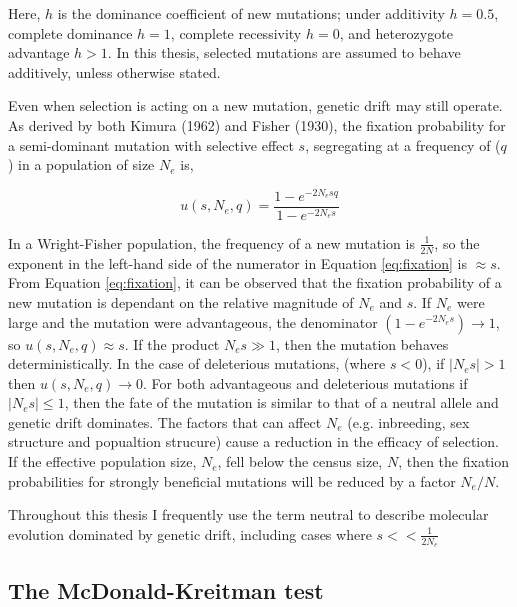\noindent

Here, $h$ is the dominance coefficient of new mutations; under additivity $h = 0.5$,  complete dominance $h = 1$, complete recessivity $h = 0$, and heterozygote advantage $h > 1$. In this thesis, selected mutations are assumed to behave additively, unless otherwise stated. 

	Even when selection is acting on a new mutation, genetic drift may still operate. As derived by both Kimura (1962) and Fisher (1930), the fixation probability for a semi-dominant mutation with selective effect $s$, segregating at a frequency of ($q$) in a population of size $N_e$ is,

\begin{equation}
	u(s, N_e, q) = \frac{1 - e^{-2N_esq}}{1 - e^{-2N_es}}
	\label{eq:fixation}
\end{equation}

\noindent
In a Wright-Fisher population, the frequency of a new mutation is $\frac{1}{2N}$, so the exponent in the left-hand side of the numerator in Equation \ref{eq:fixation} is $\approx s$. From Equation \ref{eq:fixation}, it can be observed that the fixation probability of a new mutation is dependant on the relative magnitude of $N_e$ and $s$. If $N_e$ were large and the mutation were advantageous, the denominator $(1 - e^{-2N_es}) \to 1$, so $u(s, N_e, q) \approx s$. If the product $N_es \gg 1$, then the mutation behaves deterministically. In the case of deleterious mutations, (where $s < 0$), if $|N_es| > 1$ then $u(s, N_e, q) \to 0$.  For both advantageous and deleterious mutations if $|N_es| \leq 1$, then the fate of the mutation is similar to that of a neutral allele and genetic drift dominates. The factors that can affect $N_e$ (e.g. inbreeding, sex structure and popualtion strucure) cause a reduction in the efficacy of selection. If the effective population size, $N_e$, fell below the census size, $N$, then the fixation probabilities for strongly beneficial mutations will be reduced by a factor $N_e/N$.

	Throughout this thesis I frequently use the term neutral to describe molecular evolution dominated by genetic drift, including cases where $s << \frac{1}{2N_e}$

\subsection{The McDonald-Kreitman test}

